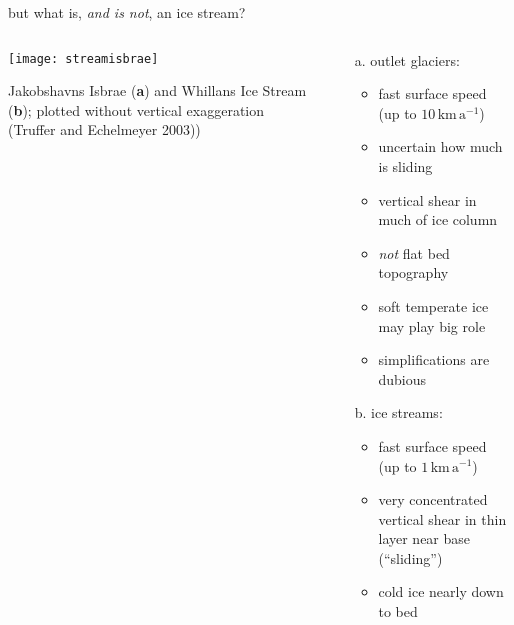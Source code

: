 \begin{frame}{but what is, \emph{and is not}, an ice stream?}

\begin{columns}
\begin{column}{0.4\textwidth}
\texttt{[image: streamisbrae]}

\bigskip
\scriptsize 
Jakobshavns Isbrae (\textbf{a}) and Whillans Ice Stream (\textbf{b}); plotted without vertical exaggeration (\tiny Truffer and Echelmeyer 2003)\scriptsize)
\end{column}
\begin{column}{0.6\textwidth}
\begin{itemize}
\item[a.] outlet glaciers:
  \begin{itemize}
  \item fast surface speed (up to $10 \,\text{km}\,\text{a}^{-1}$)
  \item uncertain how much is sliding
  \item vertical shear in much of ice column
  \item \emph{not} flat bed topography
  \item soft temperate ice may play big role
  \item \alert{simplifications are dubious}
  \end{itemize}

\medskip
\item[b.] ice streams:
  \small
  \begin{itemize}
  \item fast surface speed (up to $1 \,\text{km}\,\text{a}^{-1}$)
  \item very concentrated vertical shear in thin layer near base (``sliding'')
  \item cold ice nearly down to bed
  \end{itemize}
  \normalsize
\end{itemize}
\end{column}
\end{columns}
\end{frame}


